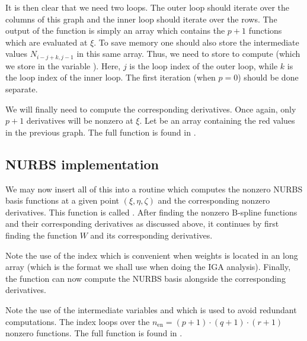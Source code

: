It is then clear that we need two loops. The outer loop should iterate over the columns of this graph and the inner loop should iterate over the rows. The output of the function  is simply an array  which contains the $p+1$ functions which are evaluated at $\xi$. To save memory one should also store the intermediate values $N_{i-j+k, j-1}$ in this same array. Thus, we need to store  to compute  (which we store in the variable ). Here, $j$ is the loop index of the outer loop, while $k$ is the loop index of the inner loop. The first iteration (when $p=0$) should be done separate.

We will finally need to compute the corresponding derivatives. Once again, only $p+1$ derivatives will be nonzero at $\xi$. Let  be an array containing the \textcolor{myRed}{red} values in the previous graph. The full function is found in .

\subsection{NURBS implementation}
We may now insert all of this into a routine which computes the nonzero NURBS basis functions at a given point $(\xi,\eta,\zeta)$ and the corresponding nonzero derivatives. This function is called . After finding the nonzero B-spline functions and their corresponding derivatives as discussed above, it continues by first finding the function $W$ and its corresponding derivatives. 

Note the use of the index  which is convenient when weights is located in an long array (which is the format we shall use when doing the IGA analysis). Finally, the function can now compute the NURBS basis alongside the corresponding derivatives.

Note the use of the intermediate variables  and  which is used to avoid redundant computations. The index  loops over the $n_{\mathrm{en}}=(p+1)\cdot(q+1)\cdot(r+1)$ nonzero functions. The full function is found in .

